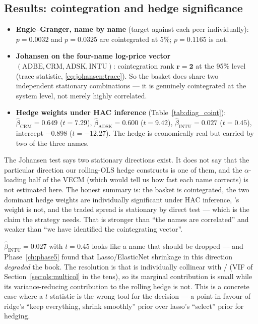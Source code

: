 \subsection{Results: cointegration and hedge significance}

\begin{itemize}
  \item \textbf{Engle--Granger, name by name} (target  against each peer
    individually):  $p=0.0032$ and  $p=0.0325$ are cointegrated at
    5\%;  $p=0.1165$ is not.
  \item \textbf{Johansen on the four-name log-price vector}
    $(\text{ADBE},\text{CRM},\text{ADSK},\text{INTU})$: cointegration rank
    $\mathbf{r=2}$ at the 95\% level (trace statistic, \eqref{eq:johansen:trace}). So the
    basket does share two independent stationary combinations --- it is genuinely
    cointegrated at the system level, not merely highly correlated.
  \item \textbf{Hedge weights under HAC inference} (Table~\ref{tab:diag_coint}):
    $\hat\beta_{\text{CRM}}=0.649$ ($t=7.29$), $\hat\beta_{\text{ADSK}}=0.600$
    ($t=9.42$), $\hat\beta_{\text{INTU}}=0.027$ ($t=0.45$), intercept $-0.898$
    ($t=-12.27$). The hedge is economically real but carried by two of the three names.
\end{itemize}

\begin{remark}
The Johansen test says two stationary directions exist. It does not say that the
particular direction our rolling-OLS hedge constructs is one of them, and the
$\alpha$-loading half of the VECM (which would tell us how fast each name corrects) is not
estimated here. The honest summary is: the basket is cointegrated, the two dominant hedge
weights are individually significant under HAC inference, 's weight is not,
and the traded spread is stationary by direct test --- which is the claim the strategy
needs. That is stronger than ``the names are correlated'' and weaker than ``we have
identified the cointegrating vector''.
\end{remark}

\begin{remark}
$\hat\beta_{\text{INTU}}=0.027$ with $t=0.45$ looks like a name that should be dropped ---
and Phase~\ref{ch:phase5} found that Lasso/ElasticNet shrinkage in this direction
\emph{degraded} the book. The resolution is that  is individually
collinear with / (VIF of Section~\ref{sec:ols:multicol} in the
tens), so its marginal contribution is small while its variance-reducing contribution to
the rolling hedge is not. This is a concrete case where a $t$-statistic is the wrong tool
for the decision --- a point in favour of ridge's ``keep everything, shrink smoothly''
prior over lasso's ``select'' prior for hedging.
\end{remark}

